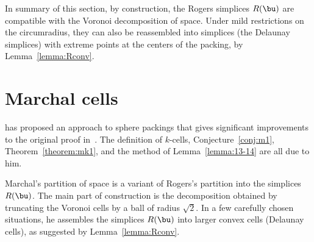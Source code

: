 In summary of this section, by construction, the Rogers simplices
$R(\bu)$ are compatible with the Voronoi decomposition of space.
Under mild restrictions on the circumradius, they can also be
reassembled into simplices (the Delaunay simplices) with extreme
points at the centers of the packing, by Lemma~\ref{lemma:Rconv}.
%
%




\section{Marchal cells}



\cite{marchal:2009} has proposed an approach to sphere packings
 that gives significant improvements to the original proof
in~\cite{Hales:2006:DCG}.  The definition of $k$-cells,
Conjecture~\ref{conj:m1}, Theorem~\ref{theorem:mk1}, and the method of
Lemma~\ref{lemma:13-14} are all due to him.  
%


Marchal's partition of space is a variant of Rogers's partition into
the simplices $R(\bu)$.  The main part of construction is the
decomposition obtained by truncating the Voronoi cells by a ball of
radius $\sqrt2$.  In a few carefully chosen situations, he assembles
the simplices $R(\bu)$ into larger convex cells (Delaunay cells), as
suggested by Lemma~\ref{lemma:Rconv}.




